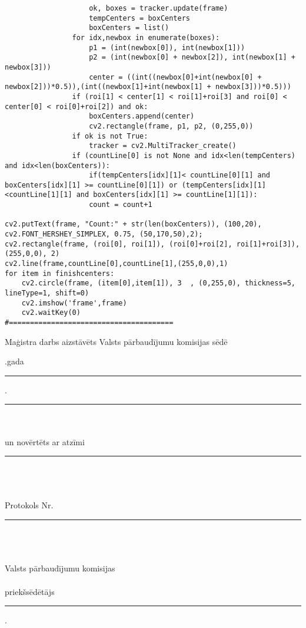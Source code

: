 \documentclass[12pt,paper=a4]{report}
\begin{document}
\begin{lstlisting}
					ok, boxes = tracker.update(frame)
					tempCenters = boxCenters
					boxCenters = list()
				for idx,newbox in enumerate(boxes):
					p1 = (int(newbox[0]), int(newbox[1]))
					p2 = (int(newbox[0] + newbox[2]), int(newbox[1] + newbox[3]))
					center = ((int((newbox[0]+int(newbox[0] + newbox[2]))*0.5)),(int((newbox[1]+int(newbox[1] + newbox[3]))*0.5)))
				if (roi[1] < center[1] < roi[1]+roi[3] and roi[0] < center[0] < roi[0]+roi[2]) and ok:
					boxCenters.append(center)
					cv2.rectangle(frame, p1, p2, (0,255,0))
				if ok is not True:
					tracker = cv2.MultiTracker_create() 
				if (countLine[0] is not None and idx<len(tempCenters) and idx<len(boxCenters)):
					if(tempCenters[idx][1]< countLine[0][1] and boxCenters[idx][1] >= countLine[0][1]) or (tempCenters[idx][1]<countLine[1][1] and boxCenters[idx][1] >= countLine[1][1]):
					count = count+1

cv2.putText(frame, "Count:" + str(len(boxCenters)), (100,20), cv2.FONT_HERSHEY_SIMPLEX, 0.75, (50,170,50),2); 
cv2.rectangle(frame, (roi[0], roi[1]), (roi[0]+roi[2], roi[1]+roi[3]), (255,0,0), 2)
cv2.line(frame,countLine[0],countLine[1],(255,0,0),1)
for item in finishcenters:
	cv2.circle(frame, (item[0],item[1]), 3  , (0,255,0), thickness=5, lineType=1, shift=0)
	cv2.imshow('frame',frame)
	cv2.waitKey(0)
#=======================================
\end{lstlisting}
\pagebreak
\pagestyle{empty}
\begin{center}
 Maģistra darbs aizstāvēts Valsts pārbaudījumu komisijas sēdē\\
 \vspace{1em}
\end{center}
.gada \rule{1cm}{0.2pt} . \rule{3cm}{0.2pt}\\\\
un novērtēts ar atzīmi \rule{4cm}{0.2pt} \\\\\\
Protokols Nr. \rule{1cm}{0.2pt}\\\\\\
Valsts pārbaudījumu komisijas \\\\
priekšsēdētājs \rule{7cm}{0.2pt}.\\
\hspace*{5cm}\textit{\raisebox{1em}{paraksts}}
\end{document}
